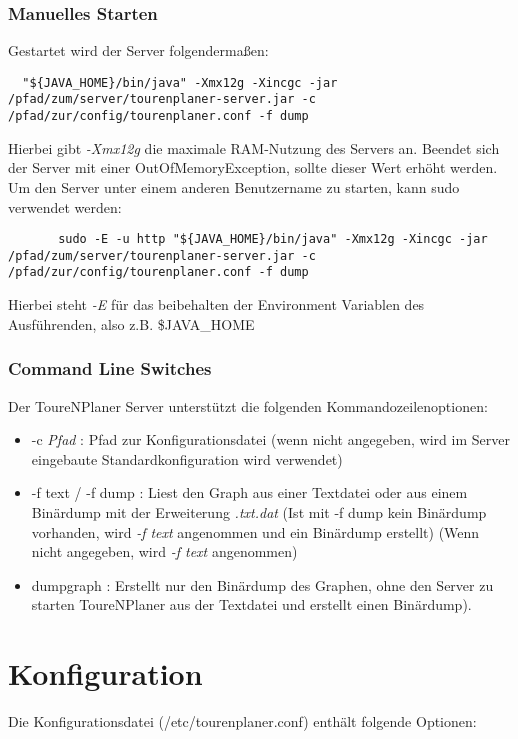 \documentclass[ngerman,titlepage,parskip=true]{scrartcl}
\begin{document}
	\subsubsection{Manuelles Starten}
  Gestartet wird der Server folgenderma\ss{}en:
	\begin{lstlisting}
  "${JAVA_HOME}/bin/java" -Xmx12g -Xincgc -jar /pfad/zum/server/tourenplaner-server.jar -c /pfad/zur/config/tourenplaner.conf -f dump
	\end{lstlisting}
	Hierbei gibt \textit{-Xmx12g} die maximale RAM-Nutzung des Servers an. Beendet sich der Server mit einer OutOfMemoryException, sollte dieser Wert erh\"oht werden.
	Um den Server unter einem anderen Benutzername zu starten, kann sudo verwendet werden:
	\begin{lstlisting}
	   sudo -E -u http "${JAVA_HOME}/bin/java" -Xmx12g -Xincgc -jar /pfad/zum/server/tourenplaner-server.jar -c /pfad/zur/config/tourenplaner.conf -f dump
	\end{lstlisting}
  Hierbei steht \textit{-E} f\"ur das beibehalten der Environment Variablen des Ausf\"uhrenden, also z.B. \$JAVA\_HOME


	\subsubsection{Command Line Switches}
	Der ToureNPlaner Server unterst\"utzt die folgenden Kommandozeilenoptionen:
	\begin{itemize}
	  \item -c \textit{Pfad} : Pfad zur Konfigurationsdatei (wenn nicht angegeben, wird im Server eingebaute Standardkonfiguration wird verwendet)
	  \item -f text / -f dump : Liest den Graph aus einer Textdatei oder aus einem Bin\"ardump mit der Erweiterung \textit{.txt.dat} (Ist mit -f dump kein Bin\"ardump vorhanden, wird \textit{-f text} angenommen und ein Bin\"ardump erstellt) (Wenn nicht angegeben, wird \textit{-f text} angenommen)
	 \item dumpgraph : Erstellt nur den Bin\"ardump des Graphen, ohne den Server zu starten
	  ToureNPlaner aus der Textdatei und erstellt einen Bin\"ardump).
	\end{itemize}

\section{Konfiguration}
Die Konfigurationsdatei (/etc/tourenplaner.conf) enth\"alt folgende Optionen:
\end{document}
